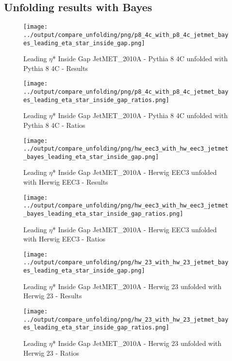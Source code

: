 \documentclass[11pt]{book}
\begin{document}
\subsection{Unfolding results with Bayes}

\begin{figure}[ht]
\centering
\texttt{[image: ../output/compare\_unfolding/png/p8\_4c\_with\_p8\_4c\_jetmet\_bayes\_leading\_eta\_star\_inside\_gap.png]}
\caption{Leading $\eta$* Inside Gap JetMET\_2010A - Pythia 8 4C unfolded with Pythia 8 4C - Results}
\label{p8_p8_jetmet_bayes_leading_eta_star_inside_gap_a}
\end{figure}

\begin{figure}[ht]
\centering
\texttt{[image: ../output/compare\_unfolding/png/p8\_4c\_with\_p8\_4c\_jetmet\_bayes\_leading\_eta\_star\_inside\_gap\_ratios.png]}
\caption{Leading $\eta$* Inside Gap JetMET\_2010A - Pythia 8 4C unfolded with Pythia 8 4C - Ratios}
\label{p8_p8_jetmet_bayes_leading_eta_star_inside_gap_b}
\end{figure}

\begin{figure}[ht]
\centering
\texttt{[image: ../output/compare\_unfolding/png/hw\_eec3\_with\_hw\_eec3\_jetmet\_bayes\_leading\_eta\_star\_inside\_gap.png]}
\caption{Leading $\eta$* Inside Gap JetMET\_2010A - Herwig EEC3 unfolded with Herwig EEC3 - Results}
\label{hw_eec3_hw_eec3_jetmet_bayes_leading_eta_star_inside_gap_a}
\end{figure}

\begin{figure}[ht]
\centering
\texttt{[image: ../output/compare\_unfolding/png/hw\_eec3\_with\_hw\_eec3\_jetmet\_bayes\_leading\_eta\_star\_inside\_gap\_ratios.png]}
\caption{Leading $\eta$* Inside Gap JetMET\_2010A - Herwig EEC3 unfolded with Herwig EEC3 - Ratios}
\label{hw_eec3_hw_eec3_jetmet_bayes_leading_eta_star_inside_gap_b}
\end{figure}

\begin{figure}[ht]
\centering
\texttt{[image: ../output/compare\_unfolding/png/hw\_23\_with\_hw\_23\_jetmet\_bayes\_leading\_eta\_star\_inside\_gap.png]}
\caption{Leading $\eta$* Inside Gap JetMET\_2010A - Herwig 23 unfolded with Herwig 23 - Results}
\label{hw_23_hw_23_jetmet_bayes_leading_eta_star_inside_gap_a}
\end{figure}

\begin{figure}[ht]
\centering
\texttt{[image: ../output/compare\_unfolding/png/hw\_23\_with\_hw\_23\_jetmet\_bayes\_leading\_eta\_star\_inside\_gap\_ratios.png]}
\caption{Leading $\eta$* Inside Gap JetMET\_2010A - Herwig 23 unfolded with Herwig 23 - Ratios}
\label{hw_23_hw_23_jetmet_bayes_leading_eta_star_inside_gap_b}
\end{figure}
\end{document}
